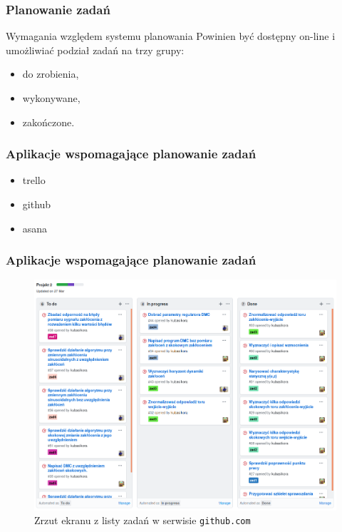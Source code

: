\begin{frame}
    \frametitle{Planowanie zadań}
    \begin{block}{Wymagania względem systemu planowania}
        Powinien być dostępny on-line i umożliwiać podział zadań na trzy grupy:
        \begin{itemize}
            \item do zrobienia,
            \item wykonywane,
            \item zakończone.
        \end{itemize}
    \end{block}
\end{frame}

\begin{frame}
    \frametitle{Aplikacje wspomagające planowanie zadań}
    \begin{itemize}
        \item trello
        \item github
        \item asana
    \end{itemize}
\end{frame}

\begin{frame}
    \frametitle{Aplikacje wspomagające planowanie zadań}
    \begin{figure}
        \centering
        \includegraphics[scale=0.26]{./images/github_example.png}
        \caption{Zrzut ekranu z listy zadań w serwisie \texttt{github.com}}
    \end{figure}
\end{frame}

